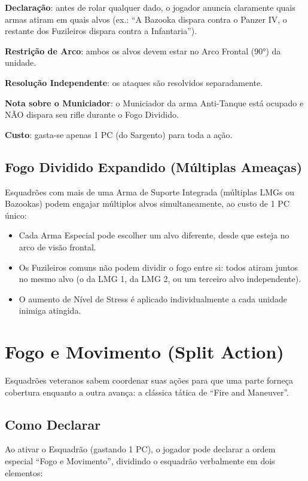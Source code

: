 \textbf{Declaração}: antes de rolar qualquer dado, o jogador anuncia claramente quais armas atiram em quais alvos (ex.: ``A Bazooka dispara contra o Panzer IV, o restante dos Fuzileiros dispara contra a Infantaria'').

\textbf{Restrição de Arco}: ambos os alvos devem estar no Arco Frontal (90°) da unidade.

\textbf{Resolução Independente}: os ataques são resolvidos separadamente.

\textbf{Nota sobre o Municiador}: o Municiador da arma Anti-Tanque está ocupado e NÃO dispara seu rifle durante o Fogo Dividido.

\textbf{Custo}: gasta-se apenas 1 PC (do Sargento) para toda a ação.

\subsection{Fogo Dividido Expandido (Múltiplas Ameaças)}

Esquadrões com mais de uma Arma de Suporte Integrada (múltiplas LMGs ou Bazookas) podem engajar múltiplos alvos simultaneamente, ao custo de 1 PC único:

\begin{itemize}[leftmargin=1.2cm]
  \item Cada Arma Especial pode escolher um alvo diferente, desde que esteja no arco de visão frontal.
  \item Os Fuzileiros comuns não podem dividir o fogo entre si: todos atiram juntos no mesmo alvo (o da LMG 1, da LMG 2, ou um terceiro alvo independente).
  \item O aumento de Nível de Stress é aplicado individualmente a cada unidade inimiga atingida.
\end{itemize}

\section{Fogo e Movimento (Split Action)}

Esquadrões veteranos sabem coordenar suas ações para que uma parte forneça cobertura enquanto a outra avança: a clássica tática de ``Fire and Maneuver''.

\subsection{Como Declarar}

Ao ativar o Esquadrão (gastando 1 PC), o jogador pode declarar a ordem especial ``Fogo e Movimento'', dividindo o esquadrão verbalmente em dois elementos:

